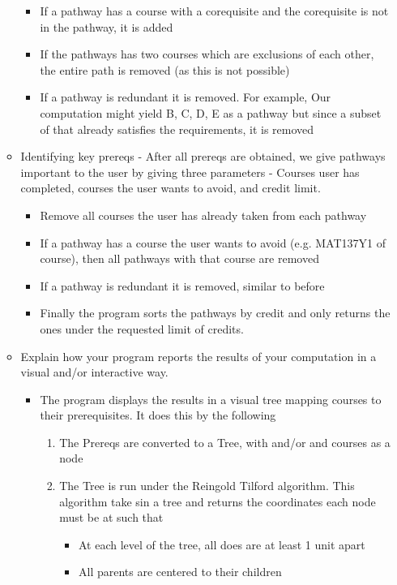 \documentclass[fontsize=11pt]{article}
\begin{document}
\begin{enumerate}
\begin{itemize}
\begin{itemize}
            \item If a pathway has a course with a corequisite and the corequisite is not in the pathway, it is added
            \item If the pathways has two courses which are exclusions of each other, the entire path is removed (as this is not possible)
            \item If a pathway is redundant it is removed. For example, Our computation might yield {B, C, D, E} as a pathway but since a subset of that already satisfies the requirements, it is removed
        \end{itemize}
        \item Identifying key prereqs - After all prereqs are obtained, we give pathways important to the user by giving three parameters - Courses user has completed, courses the user wants to avoid, and credit limit. \begin{itemize}
            \item Remove all courses the user has already taken from each pathway
            \item If a pathway has a course the user wants to avoid (e.g. MAT137Y1 of course), then all pathways with that course are removed
            \item If a pathway is redundant it is removed, similar to before \item Finally the program sorts the pathways by credit and only returns the ones under the requested limit of credits.
        \end{itemize}
        \item Explain how your program reports the results of your computation in a visual and/or interactive way. \begin{itemize}
            \item The program displays the results in a visual tree mapping courses to their prerequisites. It does this by the following \begin{enumerate}
                \item The Prereqs are converted to a Tree, with and/or and courses as a node
                \item The Tree is run under the Reingold Tilford algorithm.  This algorithm take sin a tree and returns the coordinates each node must be at such that \begin{itemize}
                    \item At each level of the tree, all does are at least 1 unit apart
                    \item All parents are centered to their children
                    

\end{itemize}
\end{enumerate}
\end{itemize}
\end{itemize}
\end{enumerate}
\end{document}
